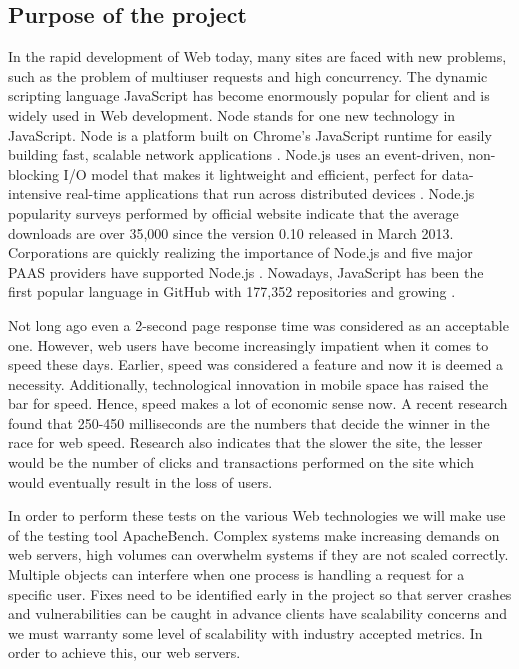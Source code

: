 \documentclass[../thesis.tex]{subfiles}
\begin{document}
\subsection{Purpose of the project}
In the rapid development of Web today, many sites are faced with new problems, such as the problem of multiuser requests and high concurrency. The dynamic scripting language JavaScript has become enormously popular for client and is widely used in Web development. Node stands for one new technology in JavaScript. Node is a platform built on Chrome's JavaScript runtime for easily building fast, scalable network applications \cite{server}. Node.js uses an event-driven, non- blocking I/O model that makes it lightweight and efficient, perfect for data-intensive real-time applications that run across distributed devices \cite{server}. Node.js popularity surveys performed by official website indicate that the average downloads are over 35,000 since the version 0.10 released in March 2013. Corporations are quickly realizing the importance of Node.js and five major PAAS providers have supported Node.js \cite{node}. Nowadays, JavaScript has been the first popular language in GitHub with 177,352 repositories and growing \cite{github-js}. 
\linebreak

Not long ago even a 2-second page response time was considered as an acceptable one. However, web users have become increasingly impatient when it comes to speed these days. Earlier, speed was considered a feature and now it is deemed a necessity. Additionally, technological innovation in mobile space has raised the bar for speed. Hence, speed makes a lot of economic sense now. A recent research found that 250-450 milliseconds are the numbers that decide the winner in the race for web speed. Research also indicates that the slower the site, the lesser would be the number of clicks and transactions performed on the site which would eventually result in the loss of users.
\linebreak

In order to perform these tests on the various Web technologies we will make use of the testing tool ApacheBench. Complex systems make increasing demands on web servers, high volumes can overwhelm systems if they are not scaled correctly. Multiple objects can interfere when one process is handling a request for a specific user. Fixes need to be identified early in the project so that server crashes and vulnerabilities can be caught in advance clients have scalability concerns and we must warranty some level of scalability with industry accepted metrics. In order to achieve this, our web servers.
\linebreak
\end{document}
